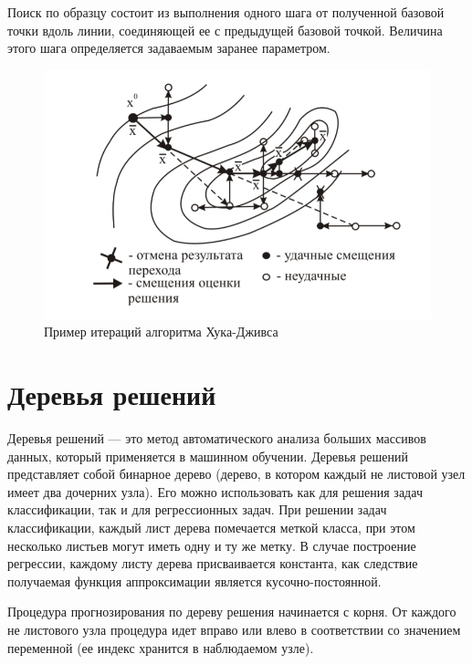 \documentclass[12pt, a4paper, russian]{article}
\begin{document}
Поиск по образцу состоит из выполнения одного шага от полученной базовой точки вдоль линии, соединяющей ее с предыдущей базовой точкой. Величина этого шага определяется задаваемым заранее параметром.



\begin{figure}[!h]
	\begin{center}
		\begin{minipage}[h]{0.8\linewidth}
			\includegraphics[width=1\linewidth]{figure/fig1.png}
			\caption{Пример итераций алгоритма Хука-Дживса} %
			\label{fig:fig1}
		\end{minipage}
	\end{center}
\end{figure}	

\section{Деревья решений}

Деревья решений --- это метод автоматического анализа больших массивов данных, который применяется в машинном обучении. Деревья решений представляет собой бинарное дерево (дерево, в котором каждый не листовой узел имеет два дочерних узла). Его можно использовать как для решения задач классификации, так и для регрессионных задач. При решении задач классификации, каждый лист дерева помечается меткой класса, при этом несколько листьев могут иметь одну и ту же метку. В случае построение регрессии, каждому листу дерева присваивается константа, как следствие  получаемая функция аппроксимации является кусочно-постоянной.

Процедура прогнозирования по дереву решения начинается с корня. От каждого не листового узла процедура идет вправо или влево в соответствии со значением переменной (ее индекс хранится в наблюдаемом узле). 
\end{document}
